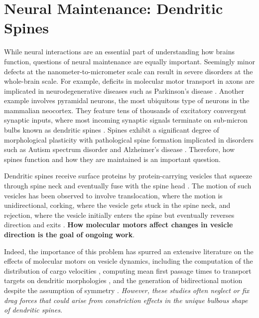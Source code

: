\documentclass[a4paper,11pt]{article}
\begin{document}
	\section{Neural Maintenance: Dendritic Spines} \label{sec:maintenance}
	
	While neural interactions are an essential part of understanding how brains function, questions of neural maintenance are equally important. Seemingly minor defects at the nanometer-to-micrometer scale can result in severe disorders at the whole-brain scale. For example, deficits in molecular motor transport in axons are implicated in neurodegenerative diseases such as Parkinson's disease \cite{millecamps2013axonal}. Another example involves pyramidal neurons, the most ubiquitous type of neurons in the mammalian neocortex. They feature tens of thousands of excitatory convergent synaptic inputs, where most incoming synaptic signals terminate on sub-micron bulbs known as dendritic spines \cite{nimchinsky2002structure}. Spines exhibit a significant degree of morphological plasticity \cite{kasai2010structural} with pathological spine formation implicated in disorders such as Autism spectrum disorder and Alzheimer's disease \cite{penzes2011dendritic}. Therefore, how spines function and how they are maintained is an important question.
	
	Dendritic spines receive surface proteins by protein-carrying vesicles that squeeze through spine neck and eventually fuse with the spine head \cite{da2015positioning}. The motion of such vesicles has been observed to involve translocation, where the motion is unidirectional, corking, where the vesicle gets stuck in the spine neck, and rejection, where the vesicle initially enters the spine but eventually reverses direction and exits \cite{park2006plasticity}. \textbf{How molecular motors affect changes in vesicle direction is the goal of ongoing work}.
	
	Indeed, the importance of this problem has spurred an extensive literature on the effects of molecular motors on vesicle dynamics, including the computation of the distribution of cargo velocities \cite{kunwar2011mechanical}, computing mean first passage times to transport targets on dendritic morphologies \cite{bressloff2013metastability}, and the generation of bidirectional motion despite the assumption of symmetry \cite{portet2019deciphering}. \textit{However, these studies often neglect or fix drag forces that could arise from constriction effects in the unique bulbous shape of dendritic spines}.
	
\end{document}
